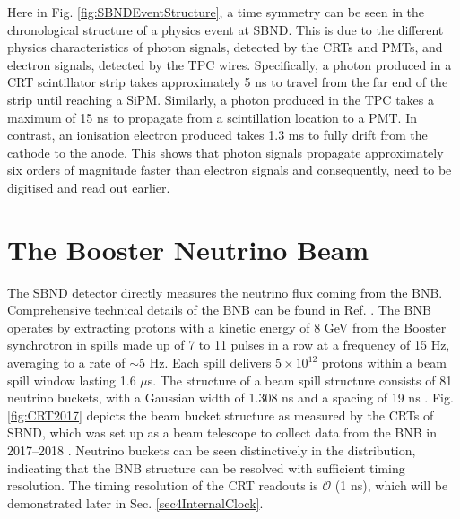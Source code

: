 
Here in Fig. \ref{fig:SBNDEventStructure}, a time symmetry can be seen in the chronological structure of a physics event at SBND.
This is due to the different physics characteristics of photon signals, detected by the CRTs and PMTs, and electron signals, detected by the TPC wires. 
Specifically, a photon produced in a CRT scintillator strip takes approximately 5 ns to travel from the far end of the strip until reaching a SiPM. 
Similarly, a photon produced in the TPC takes a maximum of 15 ns to propagate from a scintillation location to a PMT.
In contrast, an ionisation electron produced takes 1.3 ms to fully drift from the cathode to the anode.
This shows that photon signals propagate approximately six orders of magnitude faster than electron signals and consequently, need to be digitised and read out earlier.


\section{The Booster Neutrino Beam}
\label{sec4BNB}

The SBND detector directly measures the neutrino flux coming from the BNB.
Comprehensive technical details of the BNB can be found in Ref. \cite{BNBMiniBooNE}.
The BNB operates by extracting protons with a kinetic energy of 8 GeV from the Booster synchrotron in spills made up of 7 to 11 pulses in a row at a frequency of 15 Hz, averaging to a rate of $\sim$5 Hz.
Each spill delivers $5 \times 10^{12}$ protons within a beam spill window lasting 1.6 $\mu$s.
The structure of a beam spill structure consists of 81 neutrino buckets, with a Gaussian width of 1.308 ns and a spacing of 19 ns \cite{BNBsigma}.
Fig. \ref{fig:CRT2017} depicts the beam bucket structure as measured by the CRTs of SBND, which was set up as a beam telescope to collect data from the BNB in 2017--2018 \cite{CPAD2022}.
Neutrino buckets can be seen distinctively in the distribution, indicating that the BNB structure can be resolved with sufficient timing resolution.
The timing resolution of the CRT readouts is $\mathcal{O}$ (1 ns), which will be demonstrated later in Sec. \ref{sec4InternalClock}.

